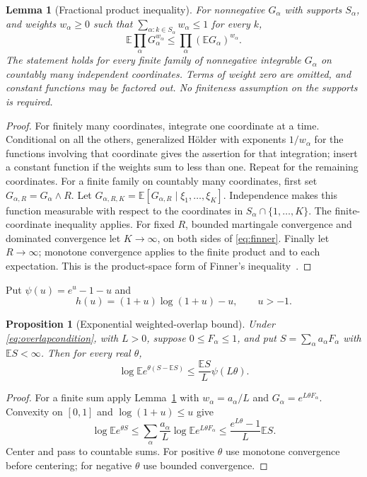 \documentclass[11pt]{article}
\numberwithin{equation}{section}
\newtheorem{lemma}[theorem]{Lemma}
\newtheorem{proposition}[theorem]{Proposition}
\theoremstyle{definition}
\theoremstyle{remark}
\newcommand{\E}{\mathbb E}
\begin{document}
\begin{lemma}[Fractional product inequality]\label{lem:finner}
For nonnegative $G_\alpha$ with supports $S_\alpha$, and weights
$w_\alpha\ge0$ such that
$\sum_{\alpha:k\in S_\alpha}w_\alpha\le1$ for every $k$,
\begin{equation}\label{eq:finner}
 \E\prod_\alpha G_\alpha^{w_\alpha}
 \le\prod_\alpha(\E G_\alpha)^{w_\alpha}.
\end{equation}
The statement holds for every finite family of nonnegative integrable
$G_\alpha$ on countably many independent coordinates. Terms of weight zero
are omitted, and constant functions may be factored out. No finiteness
assumption on the supports is required.
\end{lemma}
\begin{proof}
For finitely many coordinates, integrate one coordinate at a time. Conditional
on all the others, generalized H\"older with exponents $1/w_\alpha$ for the
functions involving that coordinate gives the assertion for that integration;
insert a constant function if the weights sum to less than one. Repeat for the
remaining coordinates. For a finite family on countably many coordinates, first set
$G_{\alpha,R}=G_\alpha\wedge R$. Let
$G_{\alpha,R,K}=\E[G_{\alpha,R}\mid\xi_1,\ldots,\xi_K]$.
Independence makes this function measurable with respect to the coordinates
in $S_\alpha\cap\{1,\ldots,K\}$. The finite-coordinate inequality applies.
For fixed $R$, bounded martingale convergence and dominated convergence let
$K\to\infty$, on both sides of \eqref{eq:finner}. Finally let $R\to\infty$;
monotone convergence applies to the finite product and to each expectation.
This is the product-space form of Finner's inequality~\cite{Finner}.
\end{proof}

Put $\psi(u)=e^u-1-u$ and
\[
 h(u)=(1+u)\log(1+u)-u,\qquad u>-1.
\]

\begin{proposition}[Exponential weighted-overlap bound]\label{prop:overlapmgf}
Under \eqref{eq:overlapcondition}, with $L>0$, suppose $0\le F_\alpha\le1$, and put
$S=\sum_\alpha a_\alpha F_\alpha$ with $\E S<\infty$. Then for every real
$\theta$,
\begin{equation}\label{eq:overlapmgf}
 \log\E e^{\theta(S-\E S)}
 \le\frac{\E S}{L}\psi(L\theta).
\end{equation}
\end{proposition}
\begin{proof}
For a finite sum apply Lemma~\ref{lem:finner} with
$w_\alpha=a_\alpha/L$ and $G_\alpha=e^{L\theta F_\alpha}$. Convexity on
$[0,1]$ and $\log(1+u)\le u$ give
\[
 \log\E e^{\theta S}
 \le\sum_\alpha\frac{a_\alpha}{L}
        \log\E e^{L\theta F_\alpha}
 \le\frac{e^{L\theta}-1}{L}\E S.
\]
Center and pass to countable sums. For positive $\theta$ use monotone
convergence before centering; for negative $\theta$ use bounded convergence.
\end{proof}
\end{document}
